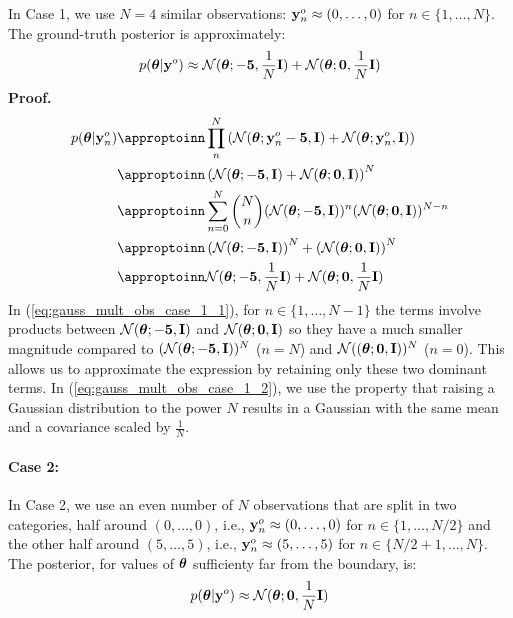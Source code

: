 In Case 1, we use $N=4$ similar observations: $\mathbf{y}^o_n \approx (0, \ldots, 0)$ for $n \in \{ 1, \ldots, N \}$. The ground-truth posterior is approximately:
%
\begin{equation}
  p(\boldsymbol{\theta} | \mathbf{y}^o) \approx \mathcal{N}(\boldsymbol{\theta}; - \mathbf{5}, \frac{1}{N} \mathbf{I}) + \mathcal{N}(\boldsymbol{\theta}; \mathbf{0}, \frac{1}{N} \mathbf{I})
  \label{eq:mog_shifted_gaussian_case_1}
\end{equation}
%
\textbf{Proof.}
%
\begin{align} 
p(\thb|{\data_n}) 
&\appropto \prod_n^{N} \left ( \mathcal{N}(\thb; \data_n - \mathbf{5}, \mathbf{I}) + \mathcal{N}( \thb; \data_n, \mathbf{I}) \right ) \\
&\appropto \left( \mathcal{N}(\thb; - \mathbf{5}, \mathbf{I}) + \mathcal{N}(\thb; \mathbf{0}, \mathbf{I}) \right)^N \\
&\appropto \sum_{n=0}^N \binom{N}{n} (\mathcal{N}(\thb; - \mathbf{5}, \mathbf{I}))^n (\mathcal{N}(\thb; \mathbf{0}, \mathbf{I}))^{N-n} \\
&\appropto \left( \mathcal{N}(\thb; - \mathbf{5}, \mathbf{I}) \right)^N + \left( \mathcal{N}( \thb; \mathbf{0}, \mathbf{I}) \right)^N \label{eq:gauss_mult_obs_case_1_1}  \\
&\appropto \mathcal{N}(\thb; - \mathbf{5}, \frac{1}{N}\mathbf{I}) + \mathcal{N}( \thb; \mathbf{0}, \frac{1}{N}\mathbf{I}) \label{eq:gauss_mult_obs_case_1_2} 
\end{align}
%
In (\ref{eq:gauss_mult_obs_case_1_1}), for $n \in \{1, \ldots, N-1\}$ the terms involve products between 
$\mathcal{N}(\boldsymbol{\theta}; - \mathbf{5}, \mathbf{I})$ and $ \mathcal{N}( \boldsymbol{\theta}; \mathbf{0}, \mathbf{I})$ so they have 
a much smaller magnitude compared to $(\mathcal{N}(\boldsymbol{\theta}; - \mathbf{5}, \mathbf{I}))^N$ ($n=N$) and $\mathcal{N}(( \boldsymbol{\theta}; \mathbf{0}, \mathbf{I}))^N$ ($n=0$).
This allows us to approximate the expression by retaining only these two dominant terms.
In (\ref{eq:gauss_mult_obs_case_1_2}), we use the property that raising a Gaussian distribution to the power \(N\) results in a Gaussian with the same mean and a covariance scaled by \(\frac{1}{N}\). 

\paragraph{Case 2:}

In Case 2, we use an even number of $N$ observations that are split in two categories, 
half around $(0, \ldots, 0)$, i.e., 
$\mathbf{y}^o_n \approx (0, \ldots, 0)$ for $n \in \{ 1, \ldots, N/2 \}$ and the other half around 
$(5, \ldots, 5)$, i.e., 
$\mathbf{y}^o_n \approx (5, \ldots, 5)$ for $n \in \{ N/2 + 1, \ldots, N \}$.
The posterior, for values of $\boldsymbol{\theta}$ sufficienty far from the boundary, is:
\begin{equation}
  p(\boldsymbol{\theta} | \mathbf{y}^o) \approx \mathcal{N}(\boldsymbol{\theta}; \mathbf{0}, \frac{1}{N} \mathbf{I})
  \label{eq:mog_shifted_gaussian_case_2}
\end{equation}

